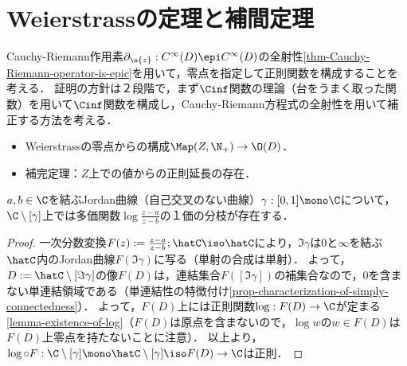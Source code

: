 \documentclass[uplatex, dvipdfmx]{jsreport}
\begin{document}
\section{Weierstrassの定理と補間定理}

\begin{tcolorbox}[colframe=ForestGreen, colback=ForestGreen!10!white,breakable,colbacktitle=ForestGreen!40!white,coltitle=black,fonttitle=\bfseries\sffamily,
title=]
    Cauchy-Riemann作用素$\partial_{\o{z}}:C^\infty(D)\epi C^\infty(D)$の全射性\ref{thm-Cauchy-Riemann-operator-is-epic}を用いて，零点を指定して正則関数を構成することを考える．
    証明の方針は２段階で，まず$\Cinf$関数の理論（台をうまく取った関数）を用いて$\Cinf$関数を構成し，Cauchy-Riemann方程式の全射性を用いて補正する方法を考える．
    \begin{itemize}
        \item Weierstrassの零点からの構成$\Map(Z,\N_+)\to\O(D)$．
        \item 補完定理：$Z$上での値からの正則延長の存在．
    \end{itemize}
\end{tcolorbox}

\begin{lemma}\label{lemma-branch-of-log}
    $a,b\in\C$を結ぶJordan曲線（自己交叉のない曲線）$\gamma:[0,1]\mono\C$について，$\C\setminus[\gamma]$上では多価関数$\log\frac{z-a}{z-b}$の１価の分枝が存在する．
\end{lemma}
\begin{proof}
    一次分数変換$F(z):=\frac{z-a}{z-b};\hatC\iso\hatC$により，$\Im\gamma$は$0$と$\infty$を結ぶ$\hatC$内のJordan曲線$F(\Im\gamma)$に写る（単射の合成は単射）．
    よって，$D:=\hatC\setminus[\Im\gamma]$の像$F(D)$は，連結集合$F([\Im\gamma])$の補集合なので，$0$を含まない単連結領域である（単連結性の特徴付け\ref{prop-characterization-of-simply-connectedness}）．
    よって，$F(D)$上には正則関数$\log:F(D)\to\C$が定まる\ref{lemma-existence-of-log}（$F(D)$は原点を含まないので，$\log w$の$w\in F(D)$は$F(D)$上零点を持たないことに注意）．
    以上より，$\log\circ F:\C\setminus[\gamma]\mono\hatC\setminus[\gamma]\iso F(D)\to\C$は正則．
\end{proof}
\end{document}
